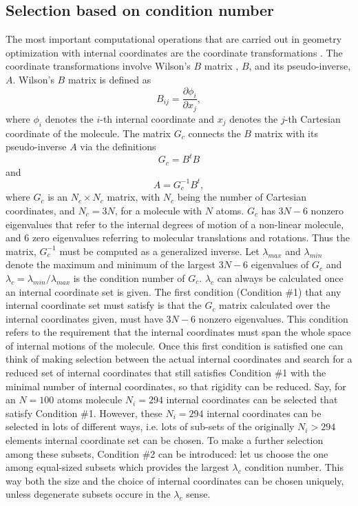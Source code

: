 \documentclass[prl,aps,preprint,superbib,12pt]{revtex4}
\begin{document}
\subsection{Selection based on condition number}
The most important computational operations 
that are carried out in geometry optimization 
with internal coordinates are the coordinate transformations 
\cite{PPulay77}. The coordinate transformations involve
Wilson's $B$ matrix \cite{EWilson55}, $B$, and its pseudo-inverse, $A$.
Wilson's $B$ matrix is defined as
\begin{equation}
B_{ij} = \frac{\partial \phi_{i}}{\partial x_{j}},
\end{equation}
where $\phi_{i}$ denotes the $i$-th internal coordinate and $x_{j}$
denotes the $j$-th Cartesian coordinate of the molecule.
The matrix $G_{c}$ connects the $B$ matrix with its pseudo-inverse
$A$ via the definitions
\begin{equation}
G_{c} = B^{t} B
\end{equation}
and
\begin{equation}
A = G_{c}^{-1} B^{t} ,
\end{equation}
where $G_{c}$ is an $N_{c} \times N_{c}$ matrix, with $N_{c}$ being the
number of Cartesian coordinates, and $N_{c}=3N$, for a molecule
with $N$ atoms. $G_{c}$ has $3N-6$ nonzero eigenvalues that refer to 
the internal degrees of motion of a non-linear molecule, and
$6$ zero eigenvalues referring to molecular translations and rotations. 
Thus the
matrix, $G_{c}^{-1}$ must be computed as a generalized inverse. 
Let $\lambda_{max}$ and $\lambda_{min}$ denote the maximum and minimum
of the largest $3N-6$ eigenvalues of $G_{c}$ and 
$\lambda_{c}=\lambda_{min}/\lambda_{max}$ is the condition number
of $G_{c}$. 
$\lambda_{c}$ can always be calculated once
an internal coordinate set is given. 
The first condition (Condition \#1) that any internal coordinate set
must satisfy is that the $G_{c}$ matrix calculated over the 
internal coordinates given,
must have $3N-6$ nonzero eigenvalues. 
This condition refers to the requirement
that the internal coordinates must span the whole space 
of internal motions of the molecule.
Once this first condition is satisfied one can think of making
selection between the actual internal coordinates and search
for a reduced set of internal coordinates that still satisfies 
Condition \#1 with the minimal number of internal coordinates, so that
rigidity can be reduced.
Say, for an $N=100$ atoms molecule $N_{i}=294$ internal coordinates
can be selected that satisfy Condition \#1. However, these $N_{i}=294$
internal coordinates can be selected in lots of different ways,
i.e. lots of sub-sets of the originally $N_{i}>294$ elements internal
coordinate set can be chosen. To make a further selection
among these subsets, Condition \#2 can be introduced:
let us choose the one among equal-sized subsets which provides the
largest $\lambda_{c}$ condition number. This way both
the size and the choice of internal coordinates can be chosen
uniquely, unless degenerate subsets occure in the $\lambda_{c}$ sense.
\end{document}

